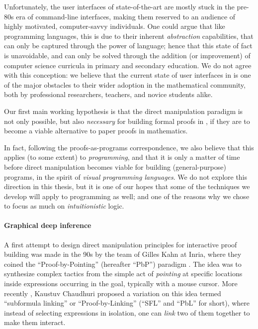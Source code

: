 Unfortunately, the user interfaces of state-of-the-art  are
mostly stuck in the pre-80s era of command-line interfaces, making them reserved
to an audience of highly motivated, computer-savvy individuals. One could argue
that like programming languages, this is due to their inherent
\emph{abstraction} capabilities, that can only be captured through the 
power of language; hence that this state of fact is unavoidable, and can only be
solved through the addition (or improvement) of computer science curricula in
primary and secondary education. We do not agree with this conception: we
believe that the current state of user interfaces in  is one of the major
obstacles to their wider adoption in the mathematical community, both by
professional researchers, teachers, and novice students alike.

\begin{emphpar}
  Our first main working hypothesis is that the direct manipulation paradigm is
  not only possible, but also \emph{necessary} for building formal proofs in
  , if they are to become a viable alternative to paper proofs in
  mathematics.
\end{emphpar}

In fact, following the proofs-as-programs correspondence, we also believe that
this applies (to some extent) to \emph{programming}, and that it is only a
matter of time before direct manipulation becomes viable for building
(general-purpose) programs, in the spirit of \emph{visual programming
languages}. We do not explore this direction in this thesis, but it is one of
our hopes that some of the techniques we develop will apply to programming as
well; and one of the reasons why we chose to focus as much on
\emph{intuitionistic} logic.

\paragraph{Graphical deep inference}

A first attempt to design direct manipulation principles for interactive proof
building was made in the 90s by the team of Gilles Kahn at Inria, where they
coined the ``Proof-by-Pointing'' (hereafter ``PbP'') paradigm .
The idea was to synthesize complex tactics from the simple act of
\emph{pointing} at specific locations inside expressions occurring in the goal,
typically with a mouse cursor. More recently , Kaustuv
Chaudhuri proposed a variation on this idea termed ``subformula linking'' or
``Proof-by-Linking'' (``SFL'' and ``PbL'' for short), where instead of selecting
expressions in isolation, one can \emph{link} two of them together to make them
interact.

